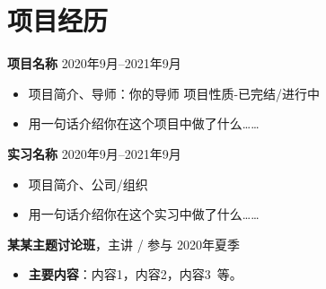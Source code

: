 \documentclass[11pt]{article}
\newcommand{\primarycolor}{\color{CUGblue}}
\newlength{\iconwidth}
\begin{document}
    \begin{minipage}[t]{\textwidth}
    \section[项目经历]{\makebox[\iconwidth][c]{\primarycolor{\faUsersCog}}\quad 项目经历}
    
    {\large \textbf{项目名称}} \hfill 2020年9月--2021年9月
    \begin{itemize}
		\item 项目简介、导师：你的导师 \hfill 项目性质-已完结/进行中
        \item 用一句话介绍你在这个项目中做了什么\dots\dots
    \end{itemize}
	
    \vspace{0.5em}
    {\large \textbf{实习名称}} \hfill 2020年9月--2021年9月
    \begin{itemize}
		\item 项目简介、公司/组织
        \item 用一句话介绍你在这个实习中做了什么\dots\dots
    \end{itemize}

    \vspace{0.5em}
    {\large \textbf{某某主题讨论班}}，主讲 / 参与 \hfill 2020年夏季
    \begin{itemize}
        \item \textbf{主要内容}：内容1，内容2，内容3\ 等。
    \end{itemize}
    
    \vspace{1.2em}
    \end{minipage}


\end{document}
